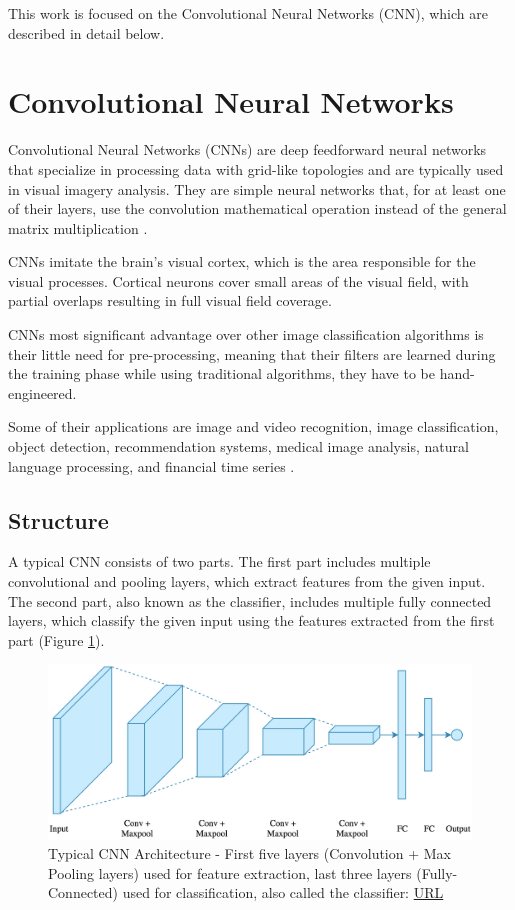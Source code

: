 This work is focused on the Convolutional Neural Networks (CNN), which are described in detail below.

\section{Convolutional Neural Networks}
Convolutional Neural Networks (CNNs) are deep feedforward neural networks that specialize in processing data with grid-like topologies and are typically used in visual imagery analysis. They are simple neural networks that, for at least one of their layers, use the convolution mathematical operation instead of the general matrix multiplication \cite{Goodfellow-et-al-2016}.

CNNs imitate the brain's visual cortex, which is the area responsible for the visual processes. Cortical neurons cover small areas of the visual field, with partial overlaps resulting in full visual field coverage.

CNNs most significant advantage over other image classification algorithms is their little need for pre-processing, meaning that their filters are learned during the training phase while using traditional algorithms, they have to be hand-engineered.

Some of their applications are image and video recognition, image classification, object detection, recommendation systems, medical image analysis, natural language processing, and financial time series \cite{Convolutional-neural-networks-wikipedia}.

\subsection{Structure}
A typical CNN consists of two parts. The first part includes multiple convolutional and pooling layers, which extract features from the given input. The second part, also known as the classifier, includes multiple fully connected layers, which classify the given input using the features extracted from the first part (Figure \ref{fig:typical-cnn-architecture}).

\begin{figure} [ht]
	\centering
	\includegraphics[width=\textwidth]{Images/typical-cnn-architecture.png}
	\decoRule
	\caption[Typical CNN Architecture]{Typical CNN Architecture - First five layers (Convolution + Max Pooling layers) used for feature extraction, last three layers (Fully-Connected) used for classification, also called the classifier: \href{https://www.kaggle.com/mauddib/digit-recogniser-tutorial-using-a-cnn-tensorflow}{URL}}
	\label{fig:typical-cnn-architecture}
\end{figure}


